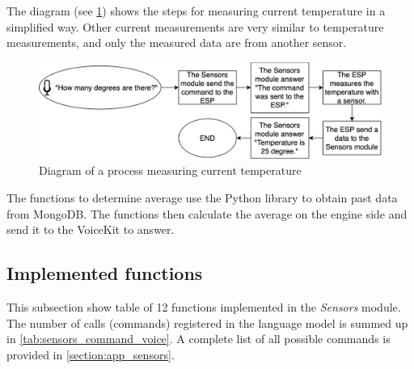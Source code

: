 The diagram (see \cref{fig:measure_sensors_diagram}) shows the steps for measuring current temperature in a simplified way. Other current measurements are very similar to temperature measurements, and only the measured data are from another sensor.

\begin{figure}[H]
    \centering
    \includegraphics[width=\textwidth]{img/measure_sensors_diagram.png}
    \caption{Diagram of a process measuring current temperature}
    \label{fig:measure_sensors_diagram}
\end{figure}

The functions to determine average use the Python library to obtain past data from MongoDB. The functions then calculate the average on the engine side and send it to the VoiceKit to answer.

\subsection{Implemented functions}

This subsection show table of 12 functions implemented in the \textit{Sensors} module. The number of calls (commands) registered in the language model is summed up in \cref{tab:sensors_command_voice}. A complete list of all possible commands is provided in \cref{section:app_sensors}.

